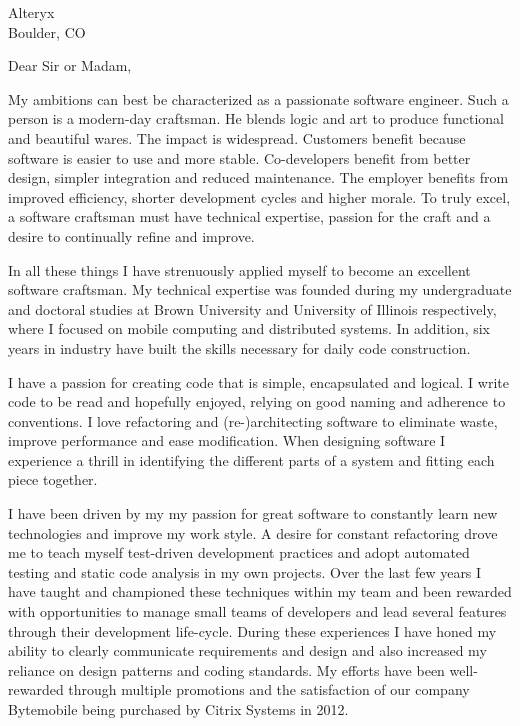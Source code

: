 \documentclass{letter}
\date{}
\begin{document}
\address{Nathanael Thompson\\1102 Lincolnshire Drive\\Champaign, IL 61821\\nat@alumni.brown.edu\\(469)
230-7125 (mobile)}
\signature{Nathanael Thompson}
\begin{letter}{Alteryx\\Boulder, CO}

\opening{Dear Sir or Madam,}
My ambitions can best be characterized as a passionate software
engineer.  Such a person is a modern-day craftsman.  He blends logic
and art to produce functional and beautiful wares.  The impact is
widespread.  Customers benefit because software is easier to use
and more stable.  Co-developers benefit from better design, simpler
integration and reduced maintenance.  The employer benefits from
improved efficiency, shorter development cycles and higher morale.
To truly excel, a software craftsman must have technical expertise,
passion for the craft and a desire to continually refine and improve.

In all these things I have strenuously applied myself to become an
excellent software craftsman.  My technical expertise was founded
during my undergraduate and doctoral studies at Brown University
and University of Illinois respectively, where I focused on mobile
computing and distributed systems.  In addition, six years in
industry have built the skills necessary for daily code construction.

I have a passion for creating code that is simple, encapsulated and
logical.  I write code to be read and hopefully enjoyed, relying
on good naming and adherence to conventions.  I love refactoring
and (re-)architecting software to eliminate waste, improve performance
and ease modification.  When designing software I experience a
thrill in identifying the different parts of a system and fitting
each piece together.

I have been driven by my my passion for great software to constantly
learn new technologies and improve my work style.  A desire for
constant refactoring drove me to teach myself test-driven development
practices and adopt automated testing and static code analysis in
my own projects.  Over the last few years I have taught and championed
these techniques within my team and been rewarded with opportunities
to manage small teams of developers and lead several features through
their development life-cycle.  During these experiences I have honed
my ability to clearly communicate requirements and design and
also increased my reliance on design patterns and coding standards.
My efforts have been well-rewarded through multiple promotions and
the satisfaction of our company Bytemobile being purchased by Citrix
Systems in 2012.


\end{letter}
\end{document}
